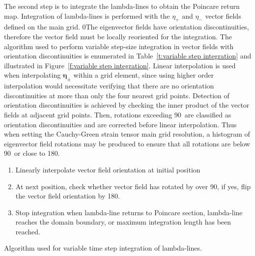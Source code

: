 \documentclass{article}
\begin{document}
The second step is to integrate the lambda-lines to obtain the Poincare return map. Integration of lambda-lines is performed with the $\eta_+$ and $\eta_-$ vector fields defined on the main grid. 
0The eigenvector fields have orientation discontinuities, therefore the vector field must be locally reoriented for the integration. The algorithm used to perform variable step-size integration in vector fields with orientation discontinuities is enumerated in Table~\ref{t:variable step integration} and illustrated in Figure~\ref{f:variable step integration}. Linear interpolation is used when interpolating $\boldsymbol \eta_\pm$ within a grid element, since using higher order interpolation would necessitate verifying that there are no orientation discontinuities at more than only the four nearest grid points. Detection of orientation discontinuities is achieved by checking the inner product of the vector fields at adjacent grid points. Then, rotations exceeding 90\degree\, are classified as orientation discontinuities and are corrected before linear interpolation. Thus when setting the Cauchy-Green strain tensor main grid resolution, a histogram of eigenvector field rotations may be produced to ensure that all rotations are below 90\degree\, or close to 180\degree.

\begin{table}
\begin{enumerate}
\item Linearly interpolate vector field orientation at initial position
\item At next position, check whether vector field has rotated by over 90\degree, if yes, flip the vector field orientation by 180\degree.
\item Stop integration when lambda-line returns to Poincare section, lambda-line reaches the domain boundary, or maximum integration length has been reached.
\end{enumerate}
\caption{Algorithm used for variable time step integration of lambda-lines.}
\label{t:variable step integration}
\end{table}
\end{document}
